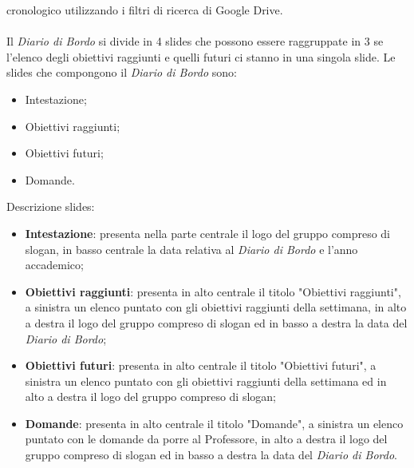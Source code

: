 cronologico utilizzando i filtri di ricerca di Google Drive.
\\\\
Il \textit{Diario di Bordo} si divide in 4 slides che possono essere raggruppate in 3 se l'elenco degli obiettivi raggiunti e quelli futuri ci stanno
in una singola slide.
Le slides che compongono il \textit{Diario di Bordo} sono:
\begin{itemize}
    \item Intestazione; 
    \item Obiettivi raggiunti;
    \item Obiettivi futuri;
    \item Domande.
\end{itemize}
Descrizione slides:
\begin{itemize}
    \item \textbf{Intestazione}: presenta nella parte centrale il logo del gruppo compreso di slogan, in basso centrale la data relativa al \textit{Diario di Bordo} e l'anno accademico;
    \item \textbf{Obiettivi raggiunti}: presenta in alto centrale il titolo "Obiettivi raggiunti", a sinistra un elenco puntato con gli obiettivi raggiunti
    della settimana, in alto a destra il logo del gruppo compreso di slogan ed in basso a destra la data del \textit{Diario di Bordo};
    \item \textbf{Obiettivi futuri}: presenta in alto centrale il titolo "Obiettivi futuri", a sinistra un elenco puntato con gli obiettivi raggiunti
    della settimana ed in alto a destra il logo del gruppo compreso di slogan;
    \item \textbf{Domande}: presenta in alto centrale il titolo "Domande", a sinistra un elenco puntato con le domande da porre al Professore, in alto a destra il logo del gruppo compreso di slogan ed in basso 
    a destra la data del \textit{Diario di Bordo}.
\end{itemize}